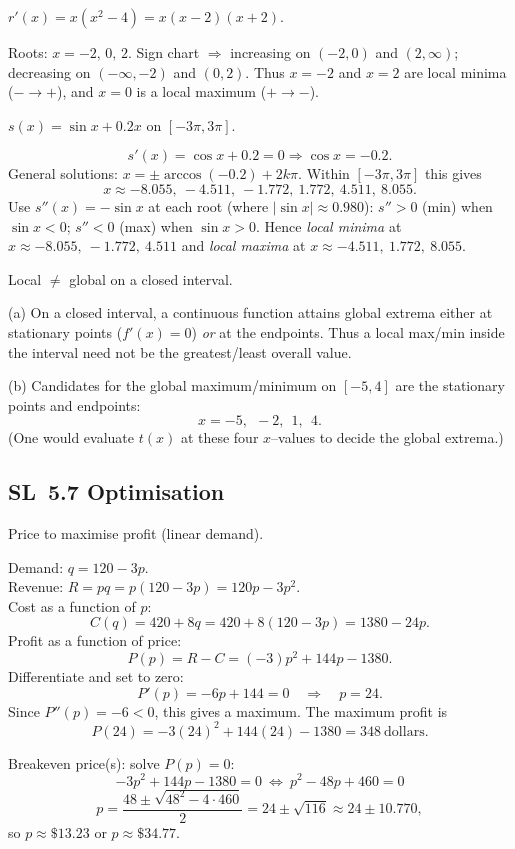 \documentclass[11pt]{article}
\def\textbf#1{#1}%
\newcommand{\tocsubsection}[1]{\subsection{#1}}
\begin{document}
\begin{solution}
\textbf{$r'(x)=x(x^{2}-4)=x(x-2)(x+2)$.}

Roots: $\boxed{x=-2,\,0,\,2}$.  
Sign chart $\Rightarrow$ increasing on $(-2,0)$ and $(2,\infty)$; decreasing on $(-\infty,-2)$ and $(0,2)$.  
Thus $x=-2$ and $x=2$ are \textbf{local minima} ($-\to+$), and $x=0$ is a \textbf{local maximum} ($+\to-$).
\end{solution}

\begin{solution}
\textbf{ $s(x)=\sin x+0.2x$ on $[-3\pi,3\pi]$.}

\[
s'(x)=\cos x+0.2=0 \Rightarrow \cos x=-0.2.
\]
General solutions: $x=\pm\arccos(-0.2)+2k\pi$.  
Within $[-3\pi,3\pi]$ this gives
\[
\boxed{x\approx -8.055,\ -4.511,\ -1.772,\ 1.772,\ 4.511,\ 8.055}.
\]
Use $s''(x)=-\sin x$ at each root (where $|\sin x|\approx 0.980$):  
$s''>0$ (min) when $\sin x<0$; $s''<0$ (max) when $\sin x>0$.  
Hence \emph{local minima} at $\boxed{x\approx -8.055,\ -1.772,\ 4.511}$ and \emph{local maxima} at $\boxed{x\approx -4.511,\ 1.772,\ 8.055}$.
\end{solution}

\begin{solution}
\textbf{Local $\neq$ global on a closed interval.}

(a) On a closed interval, a continuous function attains global extrema either at stationary points ($f'(x)=0$) \emph{or} at the endpoints. Thus a local max/min inside the interval need not be the greatest/least overall value.

(b) Candidates for the global maximum/minimum on $[-5,4]$ are the stationary points and endpoints:
\[
\boxed{x=-5,\ \ -2,\ \ 1,\ \ 4}.
\]
(One would evaluate $t(x)$ at these four $x$–values to decide the global extrema.)
\end{solution}


\tocsubsection{SL 5.7 \; Optimisation}


\begin{solution}
\textbf{Price to maximise profit (linear demand).}

Demand: \(q=120-3p\). \\
Revenue: \(R=pq=p(120-3p)=120p-3p^{2}\). \\
Cost as a function of \(p\):
\[
C(q)=420+8q=420+8(120-3p)=1380-24p.
\]
Profit as a function of price:
\[
P(p)=R-C=(-3)p^{2}+144p-1380.
\]
Differentiate and set to zero:
\[
P'(p)=-6p+144=0 \quad\Rightarrow\quad p=24.
\]
Since \(P''(p)=-6<0\), this gives a maximum.  The maximum profit is
\[
P(24)=-3(24)^{2}+144(24)-1380=348\ \text{dollars}.
\]

Breakeven price(s): solve \(P(p)=0\):
\[
-3p^{2}+144p-1380=0 \ \Longleftrightarrow\ p^{2}-48p+460=0
\]
\[
p=\frac{48\pm\sqrt{48^{2}-4\cdot 460}}{2}=24\pm\sqrt{116}
\approx 24\pm 10.770,
\]
so \(p\approx \$13.23\) or \(p\approx \$34.77\).
\end{solution}
\end{document}
